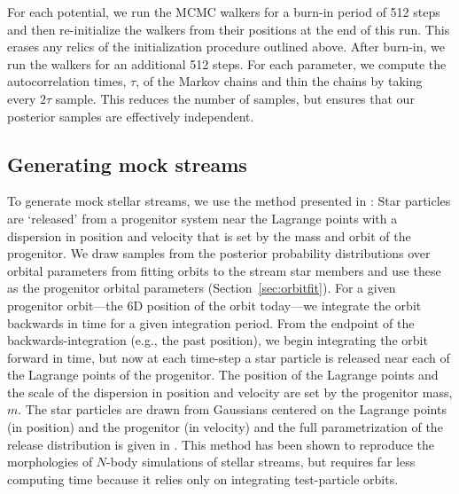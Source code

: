 For each potential, we run the MCMC walkers for a burn-in period of 512 steps and then re-initialize the walkers from their positions at the end of this run. This erases any relics of the initialization procedure outlined above. After burn-in, we run the walkers for an additional 512 steps. For each parameter, we compute the autocorrelation times, $\tau$, of the Markov chains and thin the chains by taking every $2\tau$ sample. This reduces the number of samples, but ensures that our posterior samples are effectively independent. 

\subsection{Generating mock streams}\label{sec:mocks}

To generate mock stellar streams, we use the method presented in \citet{fardal14}: Star particles are `released' from a progenitor system near the Lagrange points with a dispersion in position and velocity that is set by the mass and orbit of the progenitor. We draw samples from the posterior probability distributions over orbital parameters from fitting orbits to the stream star members and use these as the progenitor orbital parameters (Section~\ref{sec:orbitfit}). For a given progenitor orbit---the 6D position of the orbit today---we integrate the orbit backwards in time for a given integration period. From the endpoint of the backwards-integration (e.g., the past position), we begin integrating the orbit forward in time, but now at each time-step a star particle is released near each of the Lagrange points of the progenitor. The position of the Lagrange points and the scale of the dispersion in position and velocity are set by the progenitor mass, $m$. The star particles are drawn from Gaussians centered on the Lagrange points (in position) and the progenitor (in velocity) and the full parametrization of the release distribution is given in \cite{fardal14}. This method has been shown to reproduce the morphologies of $N$-body simulations of stellar streams, but requires far less computing time because it relies only on integrating test-particle orbits. 


